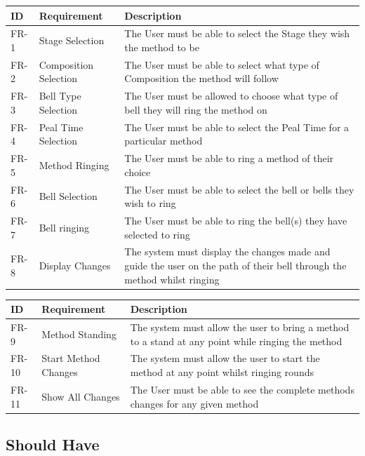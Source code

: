 \documentclass{l4proj}
\begin{document}
\begin{tabular}{| l |  p{4cm} | p{11cm} | }
\hline
\textbf{ID} & \textbf{Requirement} & \textbf{Description} \\
\hline
\hline
FR-1 & Stage Selection & The User must be able to select the Stage they wish the method to be \\
\hline
FR-2 & Composition Selection & The User must be able to select what type of Composition the method will follow \\
\hline
FR-3 & Bell Type Selection & The User must be allowed to choose what type of bell they will ring the method on \\
\hline
FR-4 & Peal Time Selection & The User must be able to select the Peal Time for a particular method \\
\hline
FR-5 & Method Ringing & The User must be able to ring a method of their choice\\
\hline
FR-6 & Bell Selection & The User must be able to select the bell or bells they wish to ring \\
\hline
FR-7 & Bell ringing & The User must be able to ring the bell(s) they have selected to ring \\
\hline
FR-8 & Display Changes & The system must display the changes made and guide the user on the path of their bell through the method whilst ringing\\
\hline
\end{tabular}



\begin{tabular}{| l |  p{4cm} | p{11cm} | }
\hline
\textbf{ID} & \textbf{Requirement} & \textbf{Description} \\
\hline
\hline
FR-9 & Method Standing & The system must allow the user to bring a method to a stand at any point while ringing the method\\
\hline
FR-10 & Start Method Changes & The system must allow the user to start the method at any point whilst ringing rounds\\
\hline
FR-11 & Show All Changes & The User must be able to see the complete methods changes for any given method \\
\hline

\hline
\end{tabular}


\subsection{Should Have}
\end{document}
